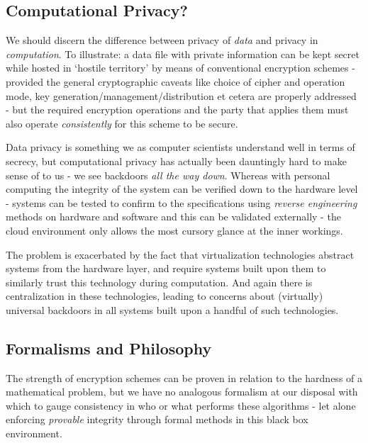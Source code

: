 \documentclass[11pt, a4paper]{article}
\begin{document}
\subsection{Computational Privacy?}
We should discern the difference between privacy of \textit{data} and privacy in \textit{computation}.
To illustrate: a data file with private information can be kept secret while hosted in `hostile territory' by means of conventional encryption schemes - provided the general cryptographic caveats like choice of cipher and operation mode, key generation/management/distribution et cetera are properly addressed - but the required encryption operations and the party that applies them must also operate \textit{consistently} for this scheme to be secure.

Data privacy is something we as computer scientists understand well in terms of secrecy, but computational privacy has actually been dauntingly hard to make sense of to us - we see backdoors \emph{all the way down}.
Whereas with personal computing the integrity of the system can be verified down to the hardware level - systems can be tested to confirm to the specifications using \textit{reverse engineering} methods on hardware and software and this can be validated externally - the cloud environment only allows the most cursory glance at the inner workings.

The problem is exacerbated by the fact that virtualization technologies abstract systems from the hardware layer, and require systems built upon them to similarly trust this technology during computation.
And again there is centralization in these technologies, leading to concerns about (virtually) universal backdoors in all systems built upon a handful of such technologies.

\subsection{Formalisms and Philosophy}
The strength of encryption schemes can be proven in relation to the hardness of a mathematical problem, but we have no analogous formalism at our disposal with which to gauge consistency in who or what performs these algorithms - let alone enforcing \textit{provable} integrity through formal methods in this black box environment.
\end{document}
